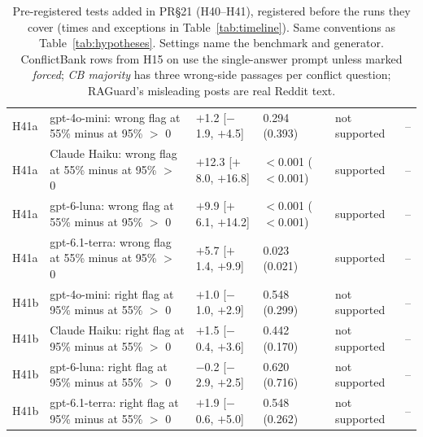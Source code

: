 \begin{table}[p]
{\begin{tabular}{lp{6.6cm}llll}
H41a & gpt-4o-mini: wrong flag at 55\% minus at 95\% $>$ 0 & $+$1.2 [$-$1.9, $+$4.5] & 0.294 (0.393) & not supported & -- \\
H41a & Claude Haiku: wrong flag at 55\% minus at 95\% $>$ 0 & $+$12.3 [$+$8.0, $+$16.8] & $<$0.001 ($<$0.001) & supported & -- \\
H41a & gpt-6-luna: wrong flag at 55\% minus at 95\% $>$ 0 & $+$9.9 [$+$6.1, $+$14.2] & $<$0.001 ($<$0.001) & supported & -- \\
H41a & gpt-6.1-terra: wrong flag at 55\% minus at 95\% $>$ 0 & $+$5.7 [$+$1.4, $+$9.9] & 0.023 (0.021) & supported & -- \\
H41b & gpt-4o-mini: right flag at 95\% minus at 55\% $>$ 0 & $+$1.0 [$-$1.0, $+$2.9] & 0.548 (0.299) & not supported & -- \\
H41b & Claude Haiku: right flag at 95\% minus at 55\% $>$ 0 & $+$1.5 [$-$0.4, $+$3.6] & 0.442 (0.170) & not supported & -- \\
H41b & gpt-6-luna: right flag at 95\% minus at 55\% $>$ 0 & $-$0.2 [$-$2.9, $+$2.5] & 0.620 (0.716) & not supported & -- \\
H41b & gpt-6.1-terra: right flag at 95\% minus at 55\% $>$ 0 & $+$1.9 [$-$0.6, $+$5.0] & 0.548 (0.262) & not supported & -- \\
\bottomrule
\end{tabular}}
\caption{Pre-registered tests added in PR\S21 (H40--H41), registered before the runs they cover (times and exceptions in
Table~\ref{tab:timeline}). Same conventions as
Table~\ref{tab:hypotheses}. Settings name the benchmark and generator. ConflictBank rows from H15 on use the
single-answer prompt unless marked \emph{forced}; \emph{CB majority} has three wrong-side passages per conflict
question; RAGuard's misleading posts are real Reddit text.}
\label{tab:hypotheses19}
\end{table}
